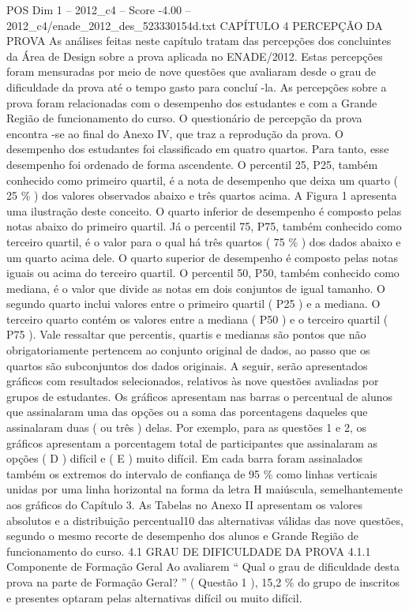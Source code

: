 \begin{textsample}{POS Dim 1 – 2012\_c4 – Score -4.00 – 2012\_c4/enade\_2012\_des\_523330154d.txt}  \label{ex:f1_pos_365}
CAPÍTULO 4 PERCEPÇÃO DA PROVA As análises feitas neste capítulo tratam das percepções dos concluintes da Área de Design sobre a prova aplicada no ENADE/2012.
Estas percepções foram mensuradas por meio de nove questões que avaliaram desde o grau de dificuldade da prova até o tempo gasto para concluí -la.
As percepções sobre a prova foram relacionadas com o desempenho dos estudantes e com a Grande Região de funcionamento do curso.
O questionário de percepção da prova encontra -se ao final do Anexo IV, que traz a reprodução da prova.
O desempenho dos estudantes foi classificado em quatro quartos.
Para tanto, esse desempenho foi ordenado de forma ascendente.
O percentil 25, P25, também conhecido como primeiro quartil, é a nota de desempenho que deixa um quarto ( 25 \% ) dos valores observados abaixo e três quartos acima.
A Figura 1 apresenta uma ilustração deste conceito.
O quarto inferior de desempenho é composto pelas notas abaixo do primeiro quartil.
Já o percentil 75, P75, também conhecido como terceiro quartil, é o valor para o qual há três quartos ( 75 \% ) dos dados abaixo e um quarto acima dele.
O quarto superior de desempenho é composto pelas notas iguais ou acima do terceiro quartil.
O percentil 50, P50, também conhecido como mediana, é o valor que divide as notas em dois conjuntos de igual tamanho.
O segundo quarto inclui valores entre o primeiro quartil ( P25 ) e a mediana.
O terceiro quarto contém os valores entre a mediana ( P50 ) e o terceiro quartil ( P75 ).
Vale ressaltar que percentis, quartis e medianas são pontos que não obrigatoriamente pertencem ao conjunto original de dados, ao passo que os quartos são subconjuntos dos dados originais.
A seguir, serão apresentados gráficos com resultados selecionados, relativos às nove questões avaliadas por grupos de estudantes.
Os gráficos apresentam nas barras o percentual de alunos que assinalaram uma das opções ou a soma das porcentagens daqueles que assinalaram duas ( ou três ) delas.
Por exemplo, para as questões 1 e 2, os gráficos apresentam a porcentagem total de participantes que assinalaram as opções ( D ) difícil e ( E ) muito difícil.
Em cada barra foram assinalados também os extremos do intervalo de confiança de 95 \% como linhas verticais unidas por uma linha horizontal na forma da letra H maiúscula, semelhantemente aos gráficos do Capítulo 3.
As Tabelas no Anexo II apresentam os valores absolutos e a distribuição percentual10 das alternativas válidas das nove questões, segundo o mesmo recorte de desempenho dos alunos e Grande Região de funcionamento do curso. 4.1 GRAU DE DIFICULDADE DA PROVA 4.1.1 Componente de Formação Geral Ao avaliarem “ Qual o grau de dificuldade desta prova na parte de Formação Geral? ” ( Questão 1 ), 15,2 \% do grupo de inscritos e presentes optaram pelas alternativas difícil ou muito difícil.

\end{textsample}
